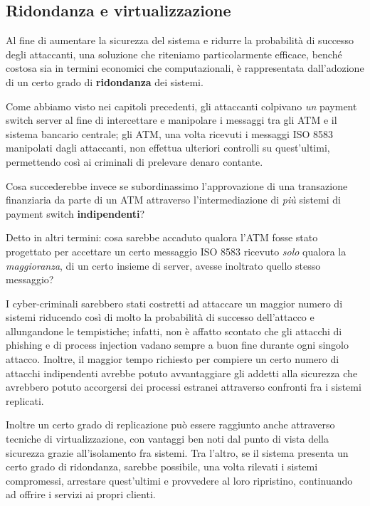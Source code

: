\documentclass[10pt,a4paper, titlepage]{report}
\begin{document}
\subsection{Ridondanza e virtualizzazione}

Al fine di aumentare la sicurezza del sistema e ridurre la probabilità di successo degli attaccanti, una soluzione che riteniamo particolarmente efficace, benché costosa sia in termini economici che computazionali, è rappresentata dall'adozione di un certo grado di \textbf{ridondanza} dei sistemi.

Come abbiamo visto nei capitoli precedenti, gli attaccanti colpivano \textit{un} payment switch server al fine di intercettare e manipolare i messaggi tra gli ATM e il sistema bancario centrale; gli ATM, una volta ricevuti i messaggi ISO 8583 manipolati dagli attaccanti, non effettua ulteriori controlli su quest'ultimi, permettendo così ai criminali di prelevare denaro contante.

Cosa succederebbe invece se subordinassimo l'approvazione di una transazione finanziaria da parte di un ATM attraverso l'intermediazione di \textit{più} sistemi di payment switch \textbf{indipendenti}? 

Detto in altri termini: cosa sarebbe accaduto qualora l'ATM fosse stato progettato per accettare un certo messaggio ISO 8583 ricevuto \textit{solo} qualora la \textit{maggioranza}, di un certo insieme di server, avesse inoltrato quello stesso messaggio?

I cyber-criminali sarebbero stati costretti ad attaccare un maggior numero di sistemi riducendo così di molto la probabilità di successo dell'attacco e allungandone le tempistiche; infatti, non è affatto scontato che gli attacchi di phishing e di process injection vadano sempre a buon fine durante ogni singolo attacco. Inoltre, il maggior tempo richiesto per compiere un certo numero di attacchi indipendenti avrebbe potuto avvantaggiare gli addetti alla sicurezza che avrebbero potuto accorgersi dei processi estranei attraverso confronti fra i sistemi replicati.

Inoltre un certo grado di replicazione può essere raggiunto anche attraverso tecniche di virtualizzazione, con vantaggi ben noti dal punto di vista della sicurezza grazie all'isolamento fra sistemi. Tra l'altro, se il sistema presenta un certo grado di ridondanza, sarebbe possibile, una volta rilevati i sistemi compromessi, arrestare quest'ultimi e provvedere al loro ripristino, continuando ad offrire i servizi ai propri clienti.
\end{document}
